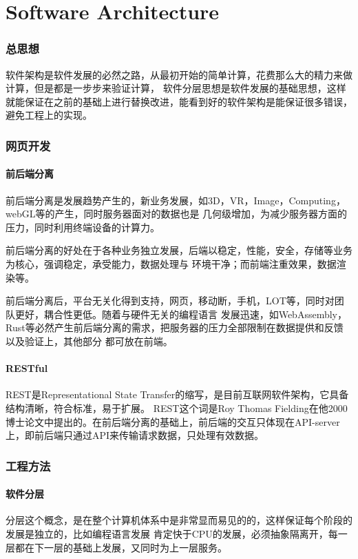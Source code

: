\clearpage
\part{Software Architecture}

\section{总思想}
软件架构是软件发展的必然之路，从最初开始的简单计算，花费那么大的精力来做计算，但是都是一步步来验证计算，
软件分层思想是软件发展的基础思想，这样就能保证在之前的基础上进行替换改进，能看到好的软件架构是能保证很多错误，
避免工程上的实现。


\section{网页开发}

\subsection{前后端分离}
前后端分离是发展趋势产生的，新业务发展，如3D，VR，Image，Computing，webGL等的产生，同时服务器面对的数据也是
几何级增加，为减少服务器方面的压力，同时利用终端设备的计算力。

前后端分离的好处在于各种业务独立发展，后端以稳定，性能，安全，存储等业务为核心，强调稳定，承受能力，数据处理与
环境干净；而前端注重效果，数据渲染等。

前后端分离后，平台无关化得到支持，网页，移动断，手机，LOT等，同时对团队更好，耦合性更低。随着与硬件无关的编程语言
发展迅速，如WebAssembly，Rust等必然产生前后端分离的需求，把服务器的压力全部限制在数据提供和反馈以及验证上，其他部分
都可放在前端。

\subsection{RESTful}
REST是Representational State Transfer的缩写，是目前互联网软件架构，它具备结构清晰，符合标准，易于扩展。
REST这个词是Roy Thomas Fielding在他2000博士论文中提出的。在前后端分离的基础上，前后端的交互只体现在API-server
上，即前后端只通过API来传输请求数据，只处理有效数据。


\section{工程方法}

\subsection{软件分层}
分层这个概念，是在整个计算机体系中是非常显而易见的的，这样保证每个阶段的发展是独立的，比如编程语言发展
肯定快于CPU的发展，必须抽象隔离开，每一层都在下一层的基础上发展，又同时为上一层服务。

